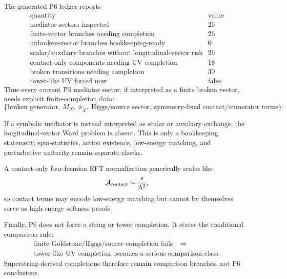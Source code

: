 \documentclass[11pt]{article}
\begin{document}
The generated P6 ledger reports
\begin{equation}
\begin{array}{c|c}
\text{quantity} & \text{value}\\
\hline
\text{mediator sectors inspected} & 26\\
\text{finite-vector branches needing completion} & 26\\
\text{unbroken-vector branches bookkeeping-ready} & 0\\
\text{scalar/auxiliary branches without longitudinal-vector risk} & 26\\
\text{contact-only components needing UV completion} & 18\\
\text{broken transitions needing completion} & 30\\
\text{tower-like UV forced now} & \text{false}
\end{array}
\end{equation}
Thus every current P3 mediator sector, if interpreted as a finite broken
vector, needs explicit finite-completion data:
\begin{equation}
  \{\text{broken generator},\ M_X,\ \phi_X,\ \text{Higgs/source sector},
  \ \text{symmetry-fixed contact/numerator terms}\}.
\end{equation}

If a symbolic mediator is instead interpreted as scalar or auxiliary
exchange, the longitudinal-vector Ward problem is absent.  This is only a
bookkeeping statement; spin-statistics, action existence, low-energy
matching, and perturbative unitarity remain separate checks.

A contact-only four-fermion EFT normalization generically scales like
\begin{equation}
  \mathcal A_{\rm contact}\sim \frac{s}{\Lambda^2},
\end{equation}
so contact terms may encode low-energy matching but cannot by themselves
serve as high-energy softness proofs.

Finally, P6 does not force a string or tower completion.  It states the
conditional comparison rule:
\begin{equation}
\begin{split}
  \text{finite Goldstone/Higgs/source completion fails}
  \quad\Longrightarrow\quad\\
  \text{tower-like UV completion becomes a serious comparison class}.
\end{split}
\end{equation}
Superstring-derived completions therefore remain comparison branches, not
P6 conclusions.
\end{document}
